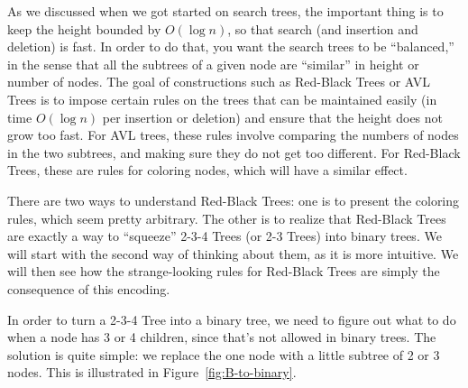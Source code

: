 As we discussed when we got started on search trees, the important
thing is to keep the height bounded by $O(\log n)$, so that search
(and insertion and deletion) is fast. In order to do that, you want
the search trees to be ``balanced,'' in the sense that all the
subtrees of a given node are ``similar'' in height or number of nodes.
The goal of constructions such as Red-Black Trees or AVL Trees is to
impose certain rules on the trees that can be maintained easily (in
time $O(\log n)$ per insertion or deletion) and ensure that the height
does not grow too fast. For AVL trees, these rules involve comparing
the numbers of nodes in the two subtrees, and making sure they do not
get too different. For Red-Black Trees, these are rules for coloring
nodes, which will have a similar effect.

There are two ways to understand Red-Black Trees: one is to present
the coloring rules, which seem pretty arbitrary. The other is to
realize that Red-Black Trees are exactly a way to ``squeeze'' 2-3-4
Trees (or 2-3 Trees) into binary trees. We will start with the second
way of thinking about them, as it is more intuitive. We will then see
how the strange-looking rules for Red-Black Trees are simply the
consequence of this encoding.

In order to turn a 2-3-4 Tree into a binary tree, we need to figure
out what to do when a node has 3 or 4 children, since that's not
allowed in binary trees. The solution is quite simple: we replace the
one node with a little subtree of 2 or 3 nodes.
This is illustrated in Figure~\ref{fig:B-to-binary}.

